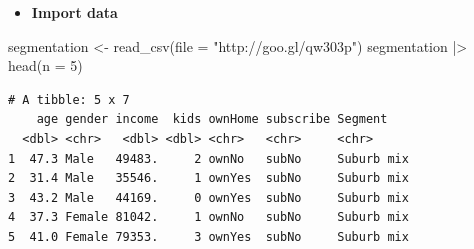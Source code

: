 \documentclass[
  ignorenonframetext,
]{beamer}
\newenvironment{Shaded}{\begin{snugshade}}{\end{snugshade}}
\newcommand{\AttributeTok}[1]{\textcolor[rgb]{0.40,0.45,0.13}{#1}}
\newcommand{\DecValTok}[1]{\textcolor[rgb]{0.68,0.00,0.00}{#1}}
\newcommand{\FunctionTok}[1]{\textcolor[rgb]{0.28,0.35,0.67}{#1}}
\newcommand{\NormalTok}[1]{\textcolor[rgb]{0.00,0.23,0.31}{#1}}
\newcommand{\OtherTok}[1]{\textcolor[rgb]{0.00,0.23,0.31}{#1}}
\newcommand{\SpecialCharTok}[1]{\textcolor[rgb]{0.37,0.37,0.37}{#1}}
\newcommand{\StringTok}[1]{\textcolor[rgb]{0.13,0.47,0.30}{#1}}
\providecommand{\tightlist}{%
  \setlength{\itemsep}{0pt}\setlength{\parskip}{0pt}}\usepackage{longtable,booktabs,array}
\begin{document}
\begin{frame}[fragile]{}
\label{section-2}
\begin{itemize}
\tightlist
\item
  \textbf{Import data}
\end{itemize}

\tiny

\begin{Shaded}
\begin{Highlighting}[]
\NormalTok{segmentation }\OtherTok{\textless{}{-}} \FunctionTok{read\_csv}\NormalTok{(}\AttributeTok{file =} \StringTok{"http://goo.gl/qw303p"}\NormalTok{)}
\NormalTok{segmentation }\SpecialCharTok{|\textgreater{}} \FunctionTok{head}\NormalTok{(}\AttributeTok{n =} \DecValTok{5}\NormalTok{)}
\end{Highlighting}
\end{Shaded}

\begin{verbatim}
# A tibble: 5 x 7
    age gender income  kids ownHome subscribe Segment   
  <dbl> <chr>   <dbl> <dbl> <chr>   <chr>     <chr>     
1  47.3 Male   49483.     2 ownNo   subNo     Suburb mix
2  31.4 Male   35546.     1 ownYes  subNo     Suburb mix
3  43.2 Male   44169.     0 ownYes  subNo     Suburb mix
4  37.3 Female 81042.     1 ownNo   subNo     Suburb mix
5  41.0 Female 79353.     3 ownYes  subNo     Suburb mix
\end{verbatim}
\end{frame}
\end{document}
